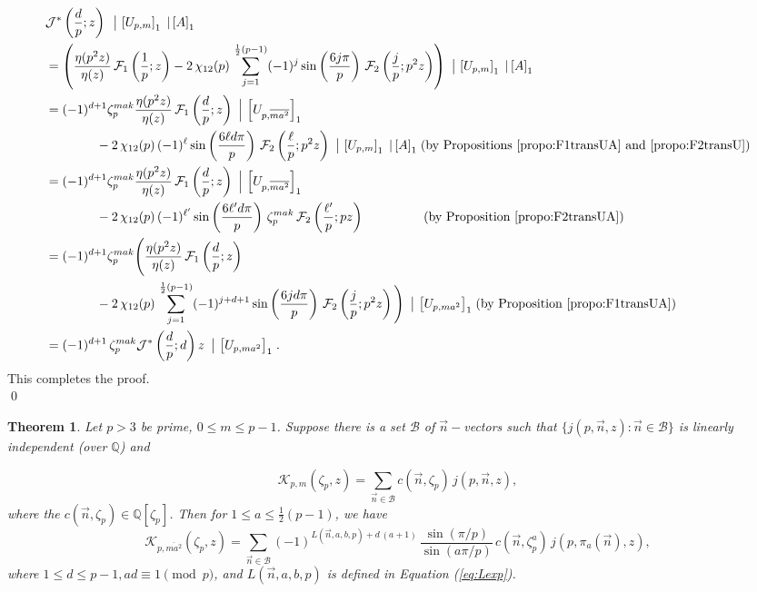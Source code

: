 \documentclass[12pt]{amsart}
\newtheorem{theorem}{Theorem}[section]
\theoremstyle{definition}
\theoremstyle{remark}
\numberwithin{equation}{section}
\newcommand\Lpar[1]{\left(#1\right)}
\newcommand\Fell[4]{\mathcal{F}_{#1}\left(\frac{#2}{#3};#4\right)}
\newcommand\JSdpz[1]{\mathcal{J}^{*}\left(\frac{d}{p};{#1}\right)}
\newcommand\strokeb[2]{\,\left\arrowvert\,\left[#1\right]_#2\right.}
\newcommand\stroke[3]{#1\,\left\arrowvert\,\left[#2\right]_{#3}\right.}
\newcommand\propo[1]{\ref{propo:#1}}
\newcommand\eqn[1]{(\ref{eq:#1})}
\begin{document}
\begin{align*}
&\stroke{\JSdpz{z}{}}{U_{p,m}}{1} \strokeb{A}{1}\\
&= \left(\frac{\eta(p^2 z)}{\eta(z)} \, \Fell{1}{1}{p}{z}
 - 
2\,\chi_{12}(p) \,
\sum_{j=1}^{\frac{1}{2}(p-1)} (-1)^{j} 
\sin\Lpar{\frac{6j\pi}{p}} \,
\Fell{2}{j}{p}{p^2 z} \right)
\strokeb{U_{p,m}}{1} \strokeb{A}{1} \\
&=
(-1)^{d+1} \zeta_p^{mak} 
\frac{\eta(p^2 z)}{\eta(z)} \, \Fell{1}{d}{p}{z}
\strokeb{U_{p,\overline{ma^2}}}{1} \\
& \qquad \qquad  - 
2\,\chi_{12}(p) \,
(-1)^{\ell} 
\sin\Lpar{\frac{6\ell d\pi}{p}} \,
\Fell{2}{\ell}{p}{p^2 z} 
\strokeb{U_{p,m}}{1} \strokeb{A}{1} 
\mbox{(by Propositions \propo{F1transUA} and \propo{F2transU})}
\\
&=
(-1)^{d+1} \zeta_p^{mak} 
\frac{\eta(p^2 z)}{\eta(z)} \, \Fell{1}{d}{p}{z}
\strokeb{U_{p,\overline{ma^2}}}{1} \\
& \qquad \qquad  - 
2\,\chi_{12}(p) \,
(-1)^{\ell'} 
\sin\Lpar{\frac{6\ell' d\pi}{p}} \,
\zeta_p^{mak} \,
\Fell{2}{\ell'}{p}{p z} 
~~\qquad\qquad\mbox{(by Proposition \propo{F2transUA})}
\\
&= (-1)^{d+1} \zeta_p^{mak}
\Bigg(\frac{\eta(p^2 z)}{\eta(z)} \, \Fell{1}{d}{p}{z}
\\ & \qquad \qquad- 
2\,\chi_{12}(p) \,
\sum_{j=1}^{\frac{1}{2}(p-1)} (-1)^{j + d + 1} 
\sin\Lpar{\frac{6jd\pi}{p}} \,
\Fell{2}{j}{p}{p^2 z} \Bigg)
\strokeb{U_{p,ma^2}}{1} 
\mbox{(by Proposition \propo{F1transUA})}\\
&= 
(-1)^{d+1}\,
\zeta_p^{mak} 
\stroke{\JSdpz{d}{z}}{U_{p,ma^2}}{1}.
\end{align*}
This completes the proof.\\
\qed

\begin{theorem}\label{thm:Kpmtransid}
Let $p>3$ be prime, $0\leq m\leq p-1$. Suppose there is a set $\mathcal{B}$ of $\overrightarrow{n}-$vectors such that $\{j(p,\overrightarrow{n},z):\overrightarrow{n} \in \mathcal{B}\}$ is linearly independent (over $\mathbb{Q}$) and

$$\mathcal{K}_{p,m}(\zeta_p,z)=\sum\limits_{\overrightarrow{n} \in \mathcal{B}}c(\overrightarrow{n},\zeta_p)\, j(p,\overrightarrow{n},z),$$ where the $c(\overrightarrow{n},\zeta_p) \in \mathbb{Q}[\zeta_p]$. Then for $1\leq a\leq \frac{1}{2}(p-1)$, we have 
\\
$$\mathcal{K}_{p,\overline{ma^2}}(\zeta_p,z)=\sum\limits_{\overrightarrow{n} \in \mathcal{B}}(-1)^{L(\overrightarrow{n},a,b,p)+d\,(a+1)}\,\frac{\sin(\pi/p)}{\sin(a\pi/p)}\,c(\overrightarrow{n},\zeta_p^a)\, j(p,\pi_a(\overrightarrow{n}),z),$$
where $1 \leq d \leq p-1, ad \equiv 1 \pmod{p}$, and $L(\overrightarrow{n},a,b,p)$ is defined in Equation \eqn{Lexp}.
\end{theorem}
\end{document}
